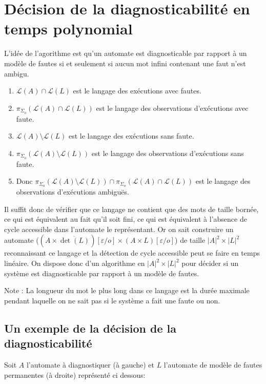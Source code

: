 \documentclass[10pt,a4paper]{article}
\begin{document}
\section{D\'ecision de la diagnosticabilit\'e en temps polynomial}

L'id\'ee de l'agorithme est qu'un automate est diagnosticable par rapport \`a un mod\`ele de fautes si et seulement si aucun mot infini contenant une faut n'est ambigu.

\begin{enumerate} 
  \item $\mathcal L (A) \cap \mathcal L(L)$ est le langage des ex\'ecutions avec fautes.
  \item $\pi_{\Sigma_o}(\mathcal L (A) \cap \mathcal L(L))$ est le langage des observations d'ex\'ecutions avec faute.
  \item $\mathcal L(A) \setminus \mathcal L(L)$ est le langage des ex\'ecutions sans faute.
  \item $\pi_{\Sigma_o}(\mathcal L(A) \setminus \mathcal L(L))$ est le langage des observations d'ex\'ecutions sans faute.
  \item Donc $\pi_{\Sigma_o}(\mathcal L(A) \setminus \mathcal L(L)) \cap \pi_{\Sigma_o}(\mathcal L (A) \cap \mathcal L(L))$ est le langage des observations d'ex\'ecutions ambiguës.
\end{enumerate}
Il suffit donc de v\'erifier que ce langage ne contient que des mots de taille born\'ee, ce qui est équivalent au fait qu'il soit fini, ce qui est \'equivalent \`a l'absence de cycle accessible dans l'automate le repr\'esentant. Or on sait construire un automate ($(A\times \overline{\det(L)})[\varepsilon/o] \times (A\times L)[\varepsilon/o]$) de taille $|A|^2 \times |L|^2$ reconnaissant ce langage et la d\'etection de cycle accessible peut se faire en temps lin\'eaire. On dispose donc d'un algorithme en $|A|^2 \times |L|^2$ pour d\'ecider si un syst\`eme est diagnosticable par rapport \`a un mod\`ele de fautes.

Note : La longueur du mot le plus long dans ce langage est la dur\'ee maximale pendant laquelle on ne sait pas si le syst\`eme a fait une faute ou non.
\subsection{Un exemple de la d\'ecision de la diagnosticabilit\'e}

Soit $A$ l'automate \`a diagnostiquer (\`a gauche) et $L$ l'automate de mod\`ele de fautes permanentes  (\`a droite) repr\'esent\'e ci dessous:
\end{document}
